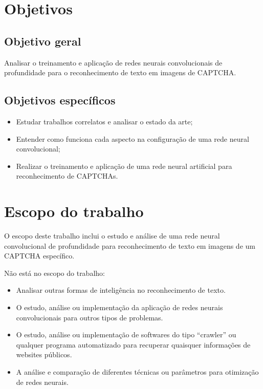 \section{Objetivos}

\subsection{Objetivo geral}

Analisar o treinamento e aplicação de redes neurais convolucionais de
profundidade para o reconhecimento de texto em imagens de CAPTCHA.

\subsection{Objetivos específicos}

\begin{itemize}
        \item Estudar trabalhos correlatos e analisar o estado da arte;
	\item Entender como funciona cada aspecto na configuração de
          uma rede neural convolucional;
	\item Realizar o treinamento e aplicação de uma rede neural
          artificial para reconhecimento de CAPTCHAs.
\end{itemize}

\section{Escopo do trabalho}

O escopo deste trabalho inclui o estudo e análise de uma rede neural
convolucional de profundidade para reconhecimento de texto em imagens de 
um CAPTCHA específico.

Não está no escopo do trabalho:

\begin{itemize}
  \item Analisar outras formas de inteligência no reconhecimento de
    texto. 
  \item O estudo, análise ou implementação da aplicação de redes
    neurais convolucionais para outros tipos de problemas. 
  \item O estudo, análise ou implementação de softwares do tipo
    ``crawler'' ou qualquer programa automatizado para recuperar
    quaisquer informações de websites públicos.
  \item A análise e comparação de diferentes técnicas ou parâmetros
    para otimização de redes neurais.
\end{itemize}

